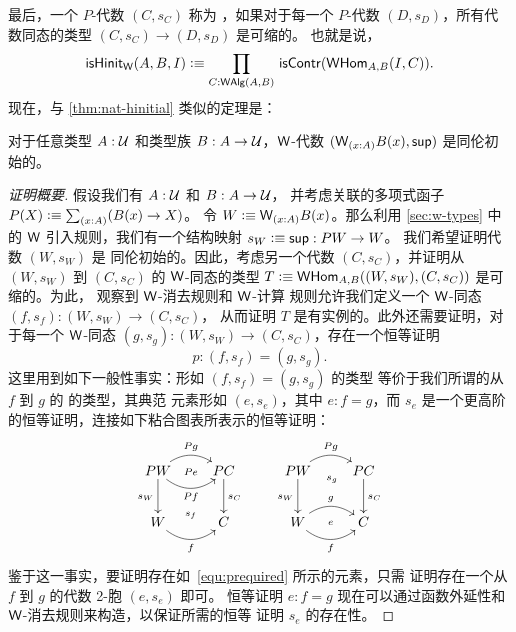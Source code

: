 %
最后，一个 $P$-代数 $(C, s_C)$ 称为
%
%
，如果对于每一个 $P$-代数 $(D, s_D)$，所有代数同态的类型 $(C, s_C) \rightarrow (D, s_D)$ 是可缩的。
也就是说，
\begin{equation*}
\ishinitw(A,B,I) \defeq \prd{C : \walg(A,B)} \iscontr(\whom_{A,B}(I,C)).
\end{equation*}
%
现在，与 \cref{thm:nat-hinitial} 类似的定理是：

\begin{thm}\label{thm:w-hinit}
对于任意类型 $A : \mathcal{U}$ 和类型族 $B : A \to \mathcal{U}$，$\mathsf{W}$-代数 $(\wtype{x:A}B(x), \supp)$ 是同伦初始的。
\end{thm}

\begin{proof}[证明概要]
假设我们有 $A : \mathcal{U}$ 和 $B : A \to \mathcal{U}$，
并考虑关联的多项式函子 $P(X)\defeq\sm{x:A}(B(x)\to X)$。
令 $W \defeq \wtype{x:A}B(x)$。那么利用
\cref{sec:w-types} 中的 $\mathsf{W}$ 引入规则，我们有一个结构映射 $s_W\vcentcolon\equiv{\mathsf{sup}}: PW \rightarrow W$。
我们希望证明代数 $(W, s_W)$ 是
同伦初始的。因此，考虑另一个代数 $(C,s_C)$，并证明从 $(W, s_W)$ 到 $(C, s_C)$ 的 $\mathsf{W}$-同态的类型 $T\vcentcolon\equiv \mathsf{W}\mathsf{Hom}_{A,B}((W, s_W),(C,s_C)) $
是可缩的。为此，
观察到 $\mathsf{W}$-消去规则和 $\mathsf{W}$-计算
规则允许我们定义一个 $\mathsf{W}$-同态 $(f, s_f) : (W, s_W) \rightarrow (C, s_C)$，
从而证明 $T$ 是有实例的。此外还需要证明，对于每一个 $\mathsf{W}$-同态 $(g, s_g) : (W, s_W) \rightarrow (C, s_C)$，存在一个恒等证明
\begin{equation}
\label{equ:prequired}
p :  (f,s_f) = (g,s_g).
\end{equation}
这里用到如下一般性事实：形如 $(f,s_f) = (g,s_g) $ 的类型
等价于我们所谓的从 $f$ 到 $g$ 的 
%
的类型，其典范
元素形如 $(e, s_e)$，其中 $e : f=g$，而 $s_e$ 是一个更高阶的恒等证明，连接如下粘合图表所表示的恒等证明：
\[
\xymatrix{
PW \ar@/^1pc/[r]^{Pg}   \ar[d]_{s_W}   \ar@/_1pc/[r]_{Pf} \ar@{}[r]|{Pe}
& PC \ar[d]^{s_C}  \\
W  \ar@/_1pc/[r]_f  \ar@{}[r]^{s_f} & C } \qquad
\xymatrix{
PW \ar@/^1pc/[r]^{Pg}   \ar[d]_{s_W} \ar@{}[r]_(.52){s_g}  & PC \ar[d]^{s_C}  \\
W \ar@/^1pc/[r]^g  \ar@/_1pc/[r]_f  \ar@{}[r]|{e} & C }
\]
鉴于这一事实，要证明存在如~\eqref{equ:prequired} 所示的元素，只需
证明存在一个从 $f$ 到 $g$ 的代数 2-胞 $(e,s_e)$ 即可。
恒等证明 $e : f=g$ 现在可以通过函数外延性和
$\mathsf{W}$-消去规则来构造，以保证所需的恒等
证明 $s_e$ 的存在性。
\end{proof}

